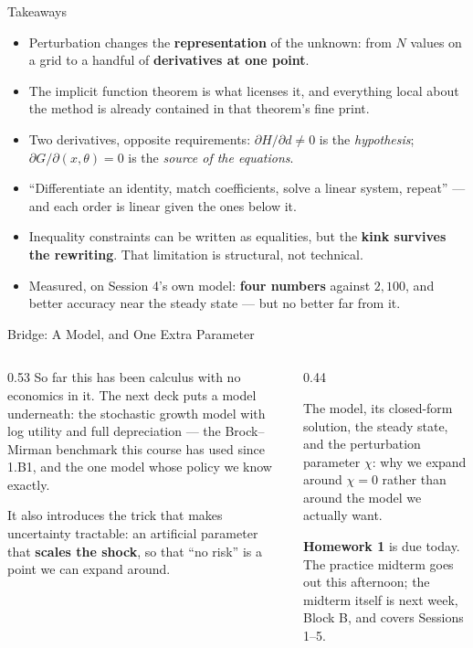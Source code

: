 \begin{frame}{Takeaways}
\begin{takeawaybox}
\begin{itemize}\small
  \item Perturbation changes the \textbf{representation} of the unknown: from $N$ values on a grid to a handful of \textbf{derivatives at one point}.
  \item The implicit function theorem is what licenses it, and everything local about the method is already contained in that theorem's fine print.
  \item Two derivatives, opposite requirements: $\partial H/\partial d \neq 0$ is the \emph{hypothesis}; $\partial G/\partial(x,\theta)=0$ is the \emph{source of the equations}.
  \item ``Differentiate an identity, match coefficients, solve a linear system, repeat'' --- and each order is linear given the ones below it.
  \item Inequality constraints can be written as equalities, but the \textbf{kink survives the rewriting}. That limitation is structural, not technical.
  \item Measured, on Session 4's own model: \textbf{four numbers} against $2{,}100$, and better accuracy near the steady state --- but no better far from it.
\end{itemize}
\end{takeawaybox}
\end{frame}

\begin{frame}{Bridge: A Model, and One Extra Parameter}
\begin{columns}[T]
\begin{column}{0.53\textwidth}
\small
So far this has been calculus with no economics in it. The next deck puts a model underneath: the stochastic growth model with log utility and full depreciation --- the Brock--Mirman benchmark this course has used since 1.B1, and the one model whose policy we know exactly.
\medskip

It also introduces the trick that makes uncertainty tractable: an artificial parameter that \textbf{scales the shock}, so that ``no risk'' is a point we can expand around.
\end{column}
\begin{column}{0.44\textwidth}
\begin{conceptbox}[title=\textbf{Next (5.A2)}]\small
The model, its closed-form solution, the steady state, and the perturbation parameter $\chi$: why we expand around $\chi=0$ rather than around the model we actually want.
\end{conceptbox}
\medskip
\begin{examplebox}\footnotesize
\textbf{Homework 1} is due today. The practice midterm goes out this afternoon; the midterm itself is next week, Block B, and covers Sessions 1--5.
\end{examplebox}
\end{column}
\end{columns}
\end{frame}


